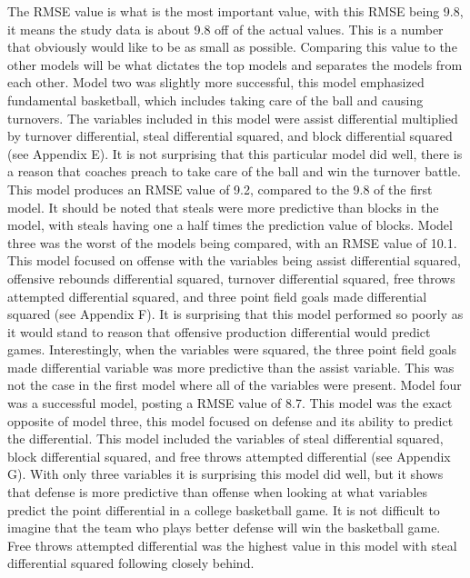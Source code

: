 \documentclass{article}
\begin{document}
\newline \indent The RMSE value is what is the most important value, with this RMSE being 9.8, it means the study data is about 9.8 off of the actual values. This is a number that obviously would like to be as small as possible. Comparing this value to the other models will be what dictates the top models and separates the models from each other. 
\newline \indent Model two was slightly more successful, this model emphasized fundamental basketball, which includes taking care of the ball and causing turnovers. The variables included in this model were assist differential multiplied by turnover differential, steal differential squared, and block differential squared (see Appendix E). It is not surprising that this particular model did well, there is a reason that coaches preach to take care of the ball and win the turnover battle. This model produces an RMSE value of 9.2, compared to the 9.8 of the first model. It should be noted that steals were more predictive than blocks in the model, with steals having one a half times the prediction value of blocks. 
\newline \indent Model three was the worst of the models being compared, with an RMSE value of 10.1. This model focused on offense with the variables being assist differential squared, offensive rebounds differential squared, turnover differential squared, free throws attempted differential squared, and three point field goals made differential squared (see Appendix F). It is surprising that this model performed so poorly as it would stand to reason that offensive production differential would predict games. Interestingly, when the variables were squared, the three point field goals made differential variable was more predictive than the assist variable. This was not the case in the first model where all of the variables were present.
\newline \indent Model four was a successful model, posting a RMSE value of 8.7. This model was the exact opposite of model three, this model focused on defense and its ability to predict the differential. This model included the variables of steal differential squared, block differential squared, and free throws attempted differential (see Appendix G). With only three variables it is surprising this model did well, but it shows that defense is more predictive than offense when looking at what variables predict the point differential in a college basketball game. It is not difficult to imagine that the team who plays better defense will win the basketball game. Free throws attempted differential was the highest value in this model with steal differential squared following closely behind. 
\end{document}
